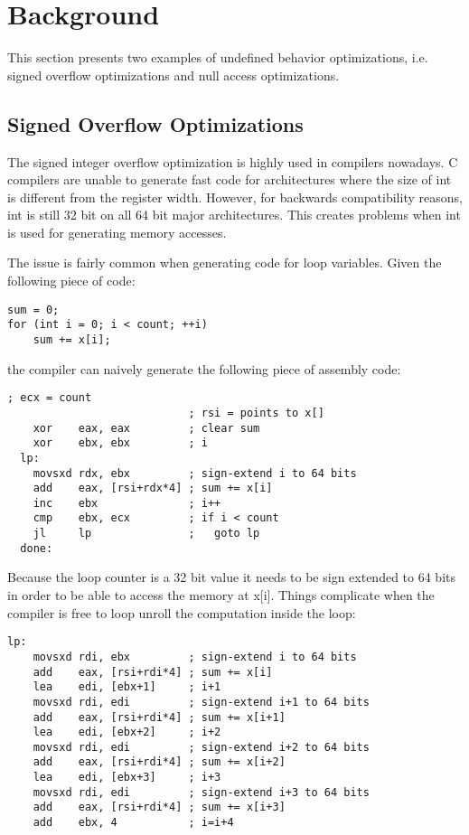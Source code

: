 \section{Background} \label{sec:bg}

This section presents two examples of undefined behavior optimizations,
i.e. signed overflow optimizations and null access optimizations.

\subsection{Signed Overflow Optimizations}
The signed integer overflow optimization is highly used in compilers
nowadays. C compilers are unable to generate fast code for
architectures where the size of int is different from the register
width. However, for backwards compatibility reasons, int is still 32 bit
on all 64 bit major architectures. This creates problems when int is
used for generating memory accesses.

The issue is fairly common when generating code for loop variables.
Given the following piece of code:
\begin{lstlisting}[style=Cstyle, caption={}, label={}]
sum = 0;
for (int i = 0; i < count; ++i)
	sum += x[i];
\end{lstlisting}
the compiler can naively generate the following piece of assembly code:
\begin{lstlisting}[style=Cstyle, caption={}, label={}]
                            ; ecx = count
                            ; rsi = points to x[]
    xor    eax, eax         ; clear sum
    xor    ebx, ebx         ; i
  lp:
    movsxd rdx, ebx         ; sign-extend i to 64 bits
    add    eax, [rsi+rdx*4] ; sum += x[i]
    inc    ebx              ; i++
    cmp    ebx, ecx         ; if i < count
    jl     lp               ;   goto lp
  done:
\end{lstlisting}

Because the loop counter is a 32 bit value it needs to be sign extended
to 64 bits in order to be able to access the memory at x[i]. Things
complicate when the compiler is free to loop unroll the computation
inside the loop:
\begin{lstlisting}[style=Cstyle, caption={}, label={}]
  lp:
    movsxd rdi, ebx         ; sign-extend i to 64 bits
    add    eax, [rsi+rdi*4] ; sum += x[i]
    lea    edi, [ebx+1]     ; i+1
    movsxd rdi, edi         ; sign-extend i+1 to 64 bits
    add    eax, [rsi+rdi*4] ; sum += x[i+1]
    lea    edi, [ebx+2]     ; i+2
    movsxd rdi, edi         ; sign-extend i+2 to 64 bits
    add    eax, [rsi+rdi*4] ; sum += x[i+2]
    lea    edi, [ebx+3]     ; i+3
    movsxd rdi, edi         ; sign-extend i+3 to 64 bits
    add    eax, [rsi+rdi*4] ; sum += x[i+3]
    add    ebx, 4           ; i=i+4
\end{lstlisting}

